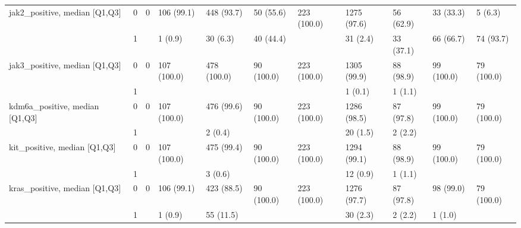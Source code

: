 \begin{tabular}{lllllllllll}
jak2\_positive, median [Q1,Q3] & 0 &                    0 &          106 (99.1) &         448 (93.7) &            50 (55.6) &         223 (100.0) &       1275 (97.6) &         56 (62.9) &           33 (33.3) &              5 (6.3) \\
                 & 1 &                      &             1 (0.9) &           30 (6.3) &            40 (44.4) &                     &          31 (2.4) &         33 (37.1) &           66 (66.7) &            74 (93.7) \\
jak3\_positive, median [Q1,Q3] & 0 &                    0 &         107 (100.0) &        478 (100.0) &           90 (100.0) &         223 (100.0) &       1305 (99.9) &         88 (98.9) &          99 (100.0) &           79 (100.0) \\
                 & 1 &                      &                     &                    &                      &                     &           1 (0.1) &           1 (1.1) &                     &                      \\
kdm6a\_positive, median [Q1,Q3] & 0 &                    0 &         107 (100.0) &         476 (99.6) &           90 (100.0) &         223 (100.0) &       1286 (98.5) &         87 (97.8) &          99 (100.0) &           79 (100.0) \\
                 & 1 &                      &                     &            2 (0.4) &                      &                     &          20 (1.5) &           2 (2.2) &                     &                      \\
kit\_positive, median [Q1,Q3] & 0 &                    0 &         107 (100.0) &         475 (99.4) &           90 (100.0) &         223 (100.0) &       1294 (99.1) &         88 (98.9) &          99 (100.0) &           79 (100.0) \\
                 & 1 &                      &                     &            3 (0.6) &                      &                     &          12 (0.9) &           1 (1.1) &                     &                      \\
kras\_positive, median [Q1,Q3] & 0 &                    0 &          106 (99.1) &         423 (88.5) &           90 (100.0) &         223 (100.0) &       1276 (97.7) &         87 (97.8) &           98 (99.0) &           79 (100.0) \\
                 & 1 &                      &             1 (0.9) &          55 (11.5) &                      &                     &          30 (2.3) &           2 (2.2) &             1 (1.0) &                      \\

\end{tabular}
